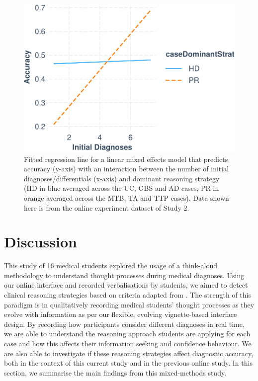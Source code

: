\documentclass[a4paper, nobind]{templates/ociamthesis}
\begin{document}
\hfill\break

\begin{figure}
\centering
\includegraphics{_main_files/figure-latex/accmodelplot-1.pdf}
\caption{\label{fig:accmodelplot}Fitted regression line for a linear mixed effects model that predicts accuracy (y-axis) with an interaction between the number of initial diagnoses/differentials (x-axis) and dominant reasoning strategy (HD in blue averaged across the UC, GBS and AD cases, PR in orange averaged across the MTB, TA and TTP cases). Data shown here is from the online experiment dataset of Study 2.}
\end{figure}

\section{Discussion}\label{discussion-2}

This study of 16 medical students explored the usage of a think-aloud methodology to understand thought processes during medical diagnoses. Using our online interface and recorded verbalisations by students, we aimed to detect clinical reasoning strategies based on criteria adapted from \autocite{coderre_diagnostic_2003}. The strength of this paradigm is in qualitatively recording medical students' thought processes as they evolve with information as per our flexible, evolving vignette-based interface design. By recording how participants consider different diagnoses in real time, we are able to understand the reasoning approach students are applying for each case and how this affects their information seeking and confidence behaviour. We are also able to investigate if these reasoning strategies affect diagnostic accuracy, both in the context of this current study and in the previous online study. In this section, we summarise the main findings from this mixed-methods study.
\end{document}
